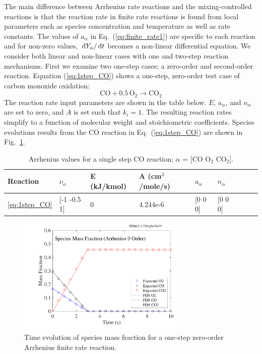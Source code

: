 \documentclass[11pt]{book}
\begin{document}
The main difference between Arrhenius rate reactions and the mixing-controlled reactions is that the reaction rate in finite rate reactions is found from local parameters such as species concentration and temperature as well as rate constants. The values of $a_{\alpha}$ in Eq.~(\ref{eq:finite_rate1}) are specific to each reaction and for non-zero values, $\,\mathrm{d} Y_{\alpha}/ \,\mathrm{d} t$ becomes  a non-linear differential equation. We consider both linear and non-linear cases with one and two-step reaction mechanisms. First we examine two one-step cases; a zero-order and second-order reaction. Equation (\ref{eq:1step_CO}) shows a one-step, zero-order test case of carbon monoxide oxidation:
\begin{equation}\label{eq:1step_CO}
\mathrm{CO+0.5 \, O_2 \rightarrow  CO_2}
\end{equation}
The reaction rate input parameters are shown in the table below. $E$, $a_{\alpha}$, and $n_{\alpha}$ are set to zero, and $A$ is set such that ${k}_{i} = 1$. The resulting reaction rates simplify to a function of molecular weight and stoichiometric coefficients. Species evolutions results from the CO reaction in Eq.~(\ref{eq:1step_CO}) are shown in Fig.~\ref{fig:Arrhenius_0Order_1step}.
\begin{table}[ht]
\begin{center}
\caption[Arrhenius values for a single step CO reaction]{Arrhenius values for a single step CO reaction; $\alpha$ = [$\mathrm{CO}$ $\mathrm{O_2}$ $\mathrm{CO_2}$].}
\label{single_step_co}
\begin{tabular}{|l|l|l|l|l|l|l|l|l|}
\hline Reaction & $\nu_{\alpha}$ & E (kJ/kmol) & A (cm$^3$/mole/s) & $a_{\alpha}$ & $n_{\alpha}$  \\ \hline \hline
\ref{eq:1step_CO} & [-1 -0.5 1] & 0 & 4.244e-6 & [0 0 0] & [0 0 0] \\ \hline
\end{tabular}
\end{center}
\end{table}
\begin{figure}[h!]
\centering
\includegraphics[height=2.2in]{SCRIPT_FIGURES/reactionrate_arrhenius_0order_1step}
\caption[Species evolution in a 0-order 1-step finite rate reaction]{Time evolution of species mass fraction for a one-step zero-order Arrhenius finite rate reaction.}
\label{fig:Arrhenius_0Order_1step}
\end{figure}
\end{document}
